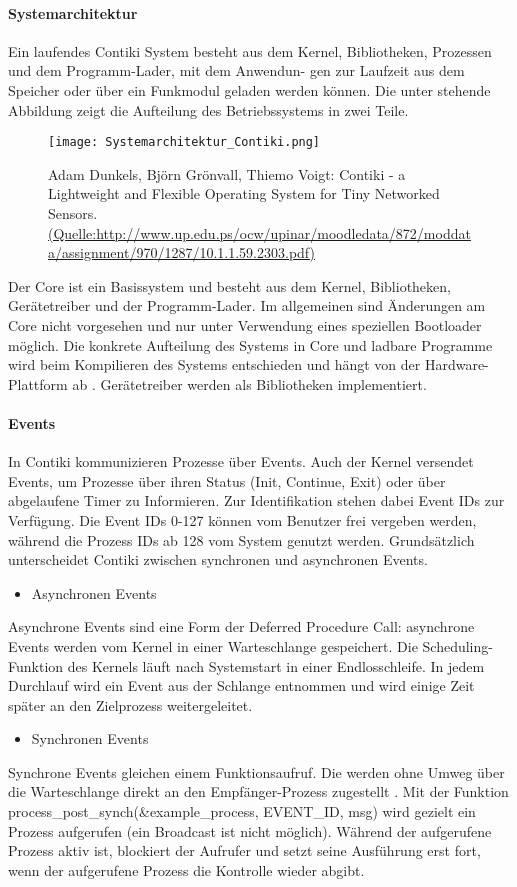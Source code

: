 \paragraph{Systemarchitektur}
Ein laufendes Contiki System besteht aus dem Kernel, Bibliotheken, Prozessen und dem Programm-Lader, mit dem Anwendun-
gen zur Laufzeit aus dem Speicher oder \"uber ein Funkmodul geladen werden k\"onnen. Die unter stehende Abbildung zeigt die Aufteilung des Betriebssystems in zwei Teile. 
\begin{figure}[h!]
	\centering
		\texttt{[image: Systemarchitektur\_Contiki.png]}
	\caption{Adam Dunkels, Bj\"orn Gr\"onvall, Thiemo Voigt: Contiki - a Lightweight and Flexible Operating System for Tiny Networked
	Sensors. \url{(Quelle:http://www.up.edu.ps/ocw/upinar/moodledata/872/moddata/assignment/970/1287/10.1.1.59.2303.pdf)}}
	\label{Systemarchitektur von Contiki}
\end{figure}
Der Core ist ein Basissystem und besteht aus dem Kernel, Bibliotheken, Ger\"{a}tetreiber und der Programm-Lader. 
Im allgemeinen sind \"Anderungen am Core nicht vorgesehen und nur unter Verwendung eines speziellen Bootloader m\"oglich. 
Die konkrete Aufteilung des Systems in Core und ladbare Programme wird beim Kompilieren des Systems entschieden und h\"angt 
von der Hardware-Plattform ab \cite[vgl.][S. 7]{Walter:2010}. Ger\"atetreiber werden als Bibliotheken implementiert. 

\paragraph{Events}
In Contiki kommunizieren Prozesse \"uber Events. Auch der Kernel versendet Events, um Prozesse \"uber ihren Status 
(Init, Continue, Exit) oder \"uber abgelaufene Timer zu Informieren. Zur Identifikation stehen dabei Event IDs zur 
Verf\"ugung. Die Event IDs 0-127 k\"onnen vom Benutzer frei vergeben werden, w\"ahrend die Prozess IDs ab 128 vom 
System genutzt werden. Grunds\"atzlich unterscheidet Contiki zwischen synchronen und asynchronen Events. 
\begin{itemize}
\item Asynchronen Events
\end{itemize}
Asynchrone Events sind eine Form der Deferred Procedure Call: asynchrone Events werden vom Kernel in einer 
Warteschlange gespeichert. Die Scheduling-Funktion des Kernels l\"auft nach Systemstart in einer Endlosschleife. 
In jedem Durchlauf wird ein Event aus der Schlange entnommen und wird einige Zeit sp\"ater an den Zielprozess weitergeleitet.
\begin{itemize}
\item Synchronen Events
\end{itemize}
Synchrone Events gleichen einem Funktionsaufruf. Die werden ohne Umweg \"uber die Warteschlange direkt an den Empf\"anger-Prozess
zugestellt \cite[vgl.][S. 7]{Walter:2010}.  Mit der Funktion process\_post\_synch(\&example\_process, EVENT\_ID, msg) wird gezielt ein 
Prozess aufgerufen (ein Broadcast ist nicht m\"oglich). W\"ahrend der aufgerufene Prozess aktiv ist, blockiert der Aufrufer und 
setzt seine Ausführung erst fort, wenn der aufgerufene Prozess die Kontrolle wieder abgibt.

